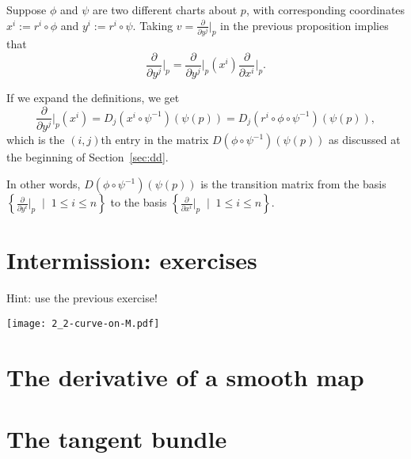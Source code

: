\begin{rmk}
    Suppose $\phi$ and $\psi$ are two different charts about $p$, with corresponding coordinates $x^i := r^i \circ \phi$ and $y^i := r^i \circ \psi$.
    Taking $v = \frac{\partial}{\partial y^j}\Big|_p$ in the previous proposition implies that
    \begin{equation}
        \frac{\partial}{\partial y^j}\Big|_p = 
        \frac{\partial}{\partial y^j}\Big|_p (x^i) \frac{\partial}{\partial x^i}\Big|_p.
    \end{equation}

    If we expand the definitions, we get
    \begin{equation}
        \frac{\partial}{\partial y^j}\Big|_p (x^i) =
        D_j(x^i\circ\psi^{-1})(\psi(p)) =
        D_j(r^i \circ \phi \circ \psi^{-1})(\psi(p)),
    \end{equation}
    which is the $(i,j)$th entry in the matrix $D(\phi\circ\psi^{-1})(\psi(p))$ as discussed at the beginning of Section~\ref{sec:dd}.

    In other words, $D(\phi\circ\psi^{-1})(\psi(p))$ is the transition matrix from the basis $\left\{\frac{\partial}{\partial y^i}\Big|_p\;\mid\; 1\leq i\leq n\right\}$ to the basis $\left\{\frac{\partial}{\partial x^i}\Big|_p\;\mid\; 1\leq i\leq n\right\}$.
\end{rmk}

\section{Intermission: exercises}
\TODO

\begin{exe}
    
\end{exe}

\begin{exe}

    Hint: use the previous exercise!

\end{exe}

\begin{exe}
    \begin{marginfigure}
        \texttt{[image: 2\_2-curve-on-M.pdf]}
      \end{marginfigure}
\end{exe}

\section{The derivative of a smooth map}

\section{The tangent bundle}